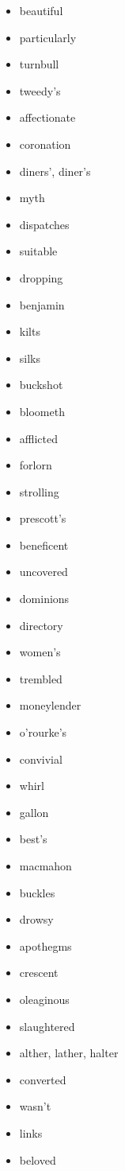 \documentclass{article}
\begin{document}
\begin{itemize}
    \item beautiful
    \item particularly
    \item turnbull
    \item tweedy's
    \item affectionate
    \item coronation
    \item diners', diner's
    \item myth
    \item dispatches
    \item suitable
    \item dropping
    \item benjamin
    \item kilts
    \item silks
    \item buckshot
    \item bloometh
    \item afflicted
    \item forlorn
    \item strolling
    \item prescott's
    \item beneficent
    \item uncovered
    \item dominions
    \item directory
    \item women's
    \item trembled
    \item moneylender
    \item o'rourke's
    \item convivial
    \item whirl
    \item gallon
    \item best's
    \item macmahon
    \item buckles
    \item drowsy
    \item apothegms
    \item crescent
    \item oleaginous
    \item slaughtered
    \item alther, lather, halter
    \item converted
    \item wasn't
    \item links
    \item beloved

\end{itemize}
\end{document}
